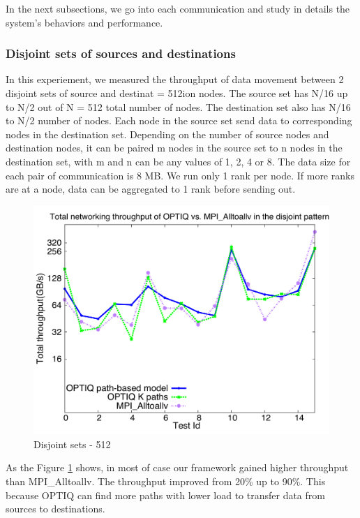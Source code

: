 In the next subsections, we go into each communication and study in details the system's behaviors and performance.

\subsubsection{Disjoint sets of sources and destinations}

In this experiement, we measured the throughput of data movement between 2 disjoint sets of source and destinat = 512ion nodes. The source set has N/16 up to N/2 out of N = 512 total number of nodes. The destination set also has N/16 to N/2 number of nodes. Each node in the source set send data to corresponding nodes in the destination set. Depending on the number of source nodes and destination nodes, it can be paired m nodes in the source set to n nodes in the destination set, with m and n can be any values of 1, 2, 4 or 8. The data size for each pair of communication is 8 MB. We run only 1 rank per node. If more ranks are at a node, data can be aggregated to 1 rank before sending out.

\begin{figure}[!htb]
\vspace{-0.1in}
\centering
\includegraphics[scale=0.30]{figures/disjoint_512.pdf}
\vspace{-0.1in}
\caption{Disjoint sets - 512}
\vspace{-0.1in}
\label{fig:disjoint_512}
\end{figure}

As the Figure \ref{fig:disjoint_512} shows, in most of case our framework gained higher throughput than MPI\_Alltoallv. The throughput improved from 20\% up to 90\%. This because OPTIQ can find more paths with lower load to transfer data from sources to destinations.


